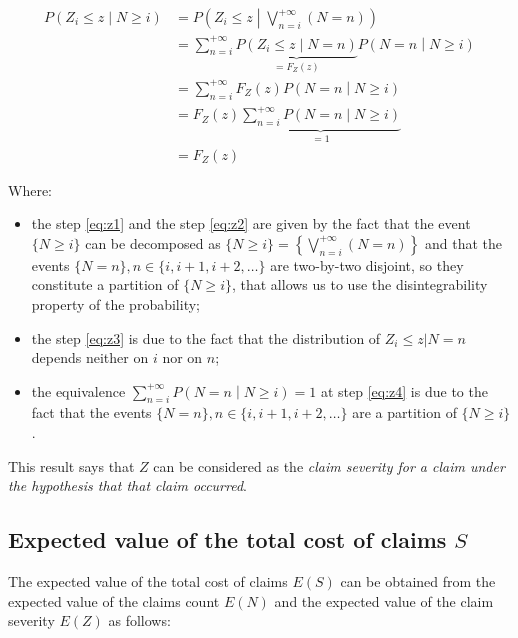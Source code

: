 \documentclass[a4paper, twoside, openright, 12pt]{report}
\providecommand{\tightlist}{%
  \setlength{\itemsep}{0pt}\setlength{\parskip}{0pt}}
\theoremstyle{definition}
\theoremstyle{definition}
\theoremstyle{definition}
\theoremstyle{remark}
\begin{document}
\begin{align}
\label{eq:z1}
P\left(Z_i \le z \middle| N\ge i \right) & = P\left(Z_i \le z \middle| \bigvee_{n = i}^{+\infty}{(N=n)}\right)
\\ \label{eq:z2} & =
\sum_{n=i}^{+\infty}{ \underbrace{P\left(Z_i\le z \middle| N=n\right)}_{=F_Z(z)} P\left( N = n \middle| N\ge i \right)}
\\ \label{eq:z3} & =
\sum_{n=i}^{+\infty}{ F_Z(z) P\left( N = n \middle| N\ge i \right)}
\\ \label{eq:z4} & =
F_Z(z) \underbrace{\sum_{n=i}^{+\infty}{P\left( N = n \middle| N\ge i \right)}}_{=1}
\\ \nonumber & =
F_Z(z)
\end{align}

Where:

\begin{itemize}
\tightlist
\item
  the step \eqref{eq:z1} and the step \eqref{eq:z2} are given by the fact that the event \(\{N\ge i\}\) can be decomposed as \(\{N\ge i\} = \left\{ \bigvee_{n = i}^{+\infty}{(N=n)} \right\}\) and that the events \(\{N=n\}, n\in\{i, i+1, i+2, \dots\}\) are two-by-two disjoint, so they constitute a partition of \(\{N\ge i\}\), that allows us to use the disintegrability property of the probability;
\item
  the step \eqref{eq:z3} is due to the fact that the distribution of \(Z_i\le z | N=n\) depends neither on \(i\) nor on \(n\);
\item
  the equivalence \(\sum_{n=i}^{+\infty}{P\left( N = n \middle| N\ge i \right)} = 1\) at step \eqref{eq:z4} is due to the fact that the events \(\{N=n\}, n\in\{i, i+1, i+2, \dots\}\) are a partition of \(\{N\ge i\}\).
\end{itemize}

This result says that \(Z\) can be considered as the \emph{claim severity for a claim under the hypothesis that that claim occurred}.

\hypertarget{expected-value-of-the-total-cost-of-claims-s}{%
\subsection{\texorpdfstring{Expected value of the total cost of claims \(S\)}{Expected value of the total cost of claims S}}\label{expected-value-of-the-total-cost-of-claims-s}}

The expected value of the total cost of claims \(E(S)\) can be obtained from the expected value of the claims count \(E(N)\) and the expected value of the claim severity \(E(Z)\) as follows:
\end{document}
